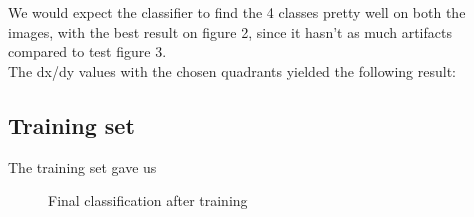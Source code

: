 \documentclass{article}
\begin{document}
	We would expect the classifier to find the 4 classes pretty well on both the images, with the best result on figure 2, since it hasn't as much artifacts compared to test figure 3.\\ 
	The dx/dy values with the chosen quadrants yielded the following result: 

\newpage

\subsection{Training set}
	The training set gave us
	\begin{figure}[h!]%
		\centering
    	\caption{Final classification after training}%
    	\label{fig:f0}%
	\end{figure}
	
\end{document}
